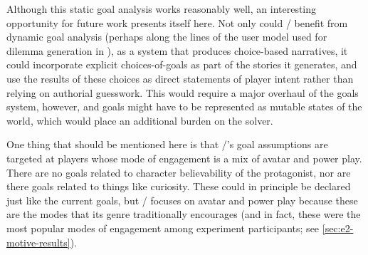 \begin{enumerate}[leftmargin=1.4em]
Although this static goal analysis works reasonably well, an interesting opportunity for future work presents itself here.
%
Not only could \dunyazad/ benefit from dynamic goal analysis (perhaps along the lines of the user model used for dilemma generation in \citep{Barber2007b}), as a system that produces choice-based narratives, it could incorporate explicit choices-of-goals as part of the stories it generates, and use the results of these choices as direct statements of player intent rather than relying on authorial guesswork.
%
This would require a major overhaul of the goals system, however, and goals might have to be represented as mutable states of the world, which would place an additional burden on the solver.

\label{sec:dunyazad-modes-of-engagement}%
One thing that should be mentioned here is that \dunyazad/'s goal assumptions are targeted at players whose mode of engagement is a mix of avatar and power play.
%
There are no goals related to character believability of the protagonist, nor are there goals related to things like curiosity.
%
These could in principle be declared just like the current goals, but \dunyazad/ focuses on avatar and power play because these are the modes that its genre traditionally encourages (and in fact, these were the most popular modes of engagement among experiment participants; see \cref{sec:e2-motive-results}).


\end{enumerate}
